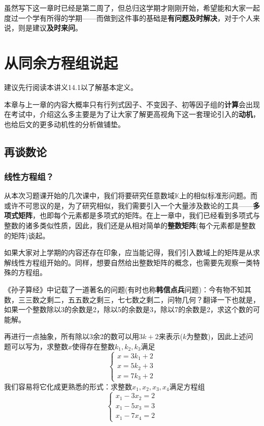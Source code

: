 \documentclass[a4paper,UTF8,fontset=windows,AutoFakeBold]{ctexart}
\newcommand*{\note}{\noindent *}
\begin{document}
\note 虽然写下这一章时已经是第二周了，但总归这学期才刚刚开始，希望能和大家一起度过一个学有所得的学期——而做到这件事的基础是\textbf{有问题及时解决}，对于个人来说，则是建议\textbf{及时来问}。

\section{从同余方程组说起}
\note 建议先行阅读本讲义14.1以了解基本定义。

\note 本章与上一章的内容大概率只有行列式因子、不变因子、初等因子组的\textbf{计算}会出现在考试中，介绍这么多主要是为了让大家了解更高视角下这一套理论引入的\textbf{动机}，也给后文的更多动机性的分析做铺垫。

\subsection{再谈数论}
\subsubsection{线性方程组？}
从本次习题课开始的几次课中，我们将要研究任意数域$\mathbb{K}$上的相似标准形问题。而或许不可思议的是，为了研究相似，我们需要引入一个大量涉及数论的工具——\textbf{多项式矩阵}，也即每个元素都是多项式的矩阵。在上一章中，我们已经看到多项式与整数的诸多类似性质，因此，我们还是从相对简单的\textbf{整数矩阵}(每个元素都是整数的矩阵)谈起。

如果大家对上学期的内容还存在印象，应当能记得，我们引入数域上的矩阵是从求解线性方程组开始的。同样，想要自然给出整数矩阵的概念，也需要先观察一类特殊的方程组。

《孙子算经》中记载了一道著名的问题(有时也称\textbf{韩信点兵}问题)：今有物不知其数，三三数之剩二，五五数之剩三，七七数之剩二，问物几何？翻译一下也就是，如果一个整数除以3的余数是2，除以5的余数是3，除以7的余数是2，求这个数的可能解。

再进行一点抽象，所有除以3余2的数可以用$3k+2$来表示($k$为整数)，因此上述问题可以写为，求整数$x$使得存在整数$k_1,k_2,k_3$满足
$$\begin{cases}x=3k_1+2\\x=5k_2+3\\x=7k_3+2\end{cases}$$
我们容易将它化成更熟悉的形式：求整数$x_1,x_2,x_3,x_4$满足方程组
$$\begin{cases}x_1-3x_2=2\\x_1-5x_3=3\\x_1-7x_4=2\end{cases}$$
\end{document}
